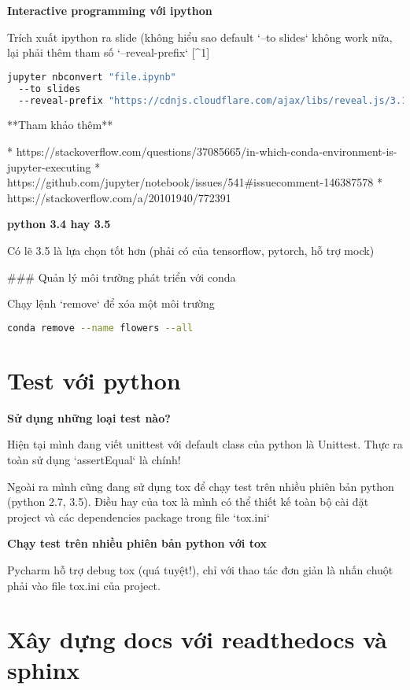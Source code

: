 \noindent \textbf{Interactive programming với ipython}

\noindent Trích xuất ipython ra slide (không hiểu sao default `--to slides` không work nữa, lại phải thêm tham số `--reveal-prefix` [^1]

\begin{lstlisting}[language=bash]
jupyter nbconvert "file.ipynb"
  --to slides
  --reveal-prefix "https://cdnjs.cloudflare.com/ajax/libs/reveal.js/3.1.0"
\end{lstlisting}

**Tham khảo thêm**

* https://stackoverflow.com/questions/37085665/in-which-conda-environment-is-jupyter-executing
* https://github.com/jupyter/notebook/issues/541#issuecomment-146387578
* https://stackoverflow.com/a/20101940/772391

\noindent \textbf{python 3.4 hay 3.5}

Có lẽ 3.5 là lựa chọn tốt hơn (phải có của tensorflow, pytorch, hỗ trợ mock)

### Quản lý môi trường phát triển với conda

Chạy lệnh `remove` để xóa một môi trường

\begin{lstlisting}[language=bash]
conda remove --name flowers --all
\end{lstlisting}

\section{Test với python}

\textbf{Sử dụng những loại test nào?}

Hiện tại mình đang viết unittest với default class của python là Unittest. Thực ra toàn sử dụng `assertEqual` là chính!

Ngoài ra mình cũng đang sử dụng tox để chạy test trên nhiều phiên bản python (python 2.7, 3.5). Điều hay của tox là mình có thể thiết kế toàn bộ cài đặt project và các dependencies package trong file `tox.ini`

\textbf{Chạy test trên nhiều phiên bản python với tox}

Pycharm hỗ trợ debug tox (quá tuyệt!), chỉ với thao tác đơn giản là nhấn chuột phải vào file tox.ini của project.

\section{Xây dựng docs với readthedocs và sphinx}

